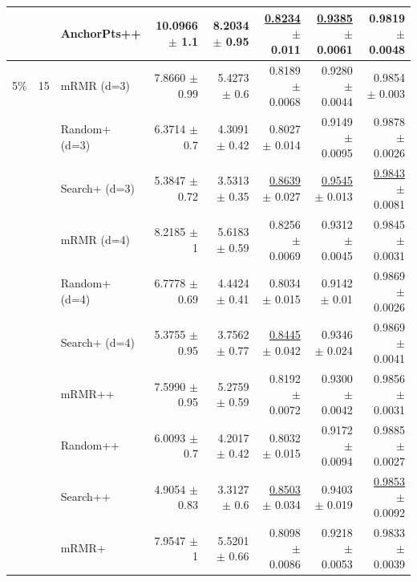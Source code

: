 \begin{longtable}{llp{}rrrrr}
 &  & AnchorPts++ & 10.0966 {\scriptsize $\pm$ 1.1} & 8.2034 {\scriptsize $\pm$ 0.95} & \underline{0.8234} {\scriptsize $\pm$ 0.011} & \underline{0.9385} {\scriptsize $\pm$ 0.0061} & 0.9819 {\scriptsize $\pm$ 0.0048} \\
\midrule
5\% & 15 & mRMR (d=3) & 7.8660 {\scriptsize $\pm$ 0.99} & 5.4273 {\scriptsize $\pm$ 0.6} & 0.8189 {\scriptsize $\pm$ 0.0068} & 0.9280 {\scriptsize $\pm$ 0.0044} & 0.9854 {\scriptsize $\pm$ 0.003} \\
 &  & Random+ (d=3) & 6.3714 {\scriptsize $\pm$ 0.7} & 4.3091 {\scriptsize $\pm$ 0.42} & 0.8027 {\scriptsize $\pm$ 0.014} & 0.9149 {\scriptsize $\pm$ 0.0095} & 0.9878 {\scriptsize $\pm$ 0.0026} \\
 &  & Search+ (d=3) & 5.3847 {\scriptsize $\pm$ 0.72} & 3.5313 {\scriptsize $\pm$ 0.35} & \underline{0.8639} {\scriptsize $\pm$ 0.027} & \underline{0.9545} {\scriptsize $\pm$ 0.013} & \underline{0.9843} {\scriptsize $\pm$ 0.0081} \\
 &  & mRMR (d=4) & 8.2185 {\scriptsize $\pm$ 1} & 5.6183 {\scriptsize $\pm$ 0.59} & 0.8256 {\scriptsize $\pm$ 0.0069} & 0.9312 {\scriptsize $\pm$ 0.0045} & 0.9845 {\scriptsize $\pm$ 0.0031} \\
 &  & Random+ (d=4) & 6.7778 {\scriptsize $\pm$ 0.69} & 4.4424 {\scriptsize $\pm$ 0.41} & 0.8034 {\scriptsize $\pm$ 0.015} & 0.9142 {\scriptsize $\pm$ 0.01} & 0.9869 {\scriptsize $\pm$ 0.0026} \\
 &  & Search+ (d=4) & 5.3755 {\scriptsize $\pm$ 0.95} & 3.7562 {\scriptsize $\pm$ 0.77} & \underline{0.8445} {\scriptsize $\pm$ 0.042} & 0.9346 {\scriptsize $\pm$ 0.024} & 0.9869 {\scriptsize $\pm$ 0.0041} \\
 &  & mRMR++ & 7.5990 {\scriptsize $\pm$ 0.95} & 5.2759 {\scriptsize $\pm$ 0.59} & 0.8192 {\scriptsize $\pm$ 0.0072} & 0.9300 {\scriptsize $\pm$ 0.0042} & 0.9856 {\scriptsize $\pm$ 0.0031} \\
 &  & Random++ & 6.0093 {\scriptsize $\pm$ 0.7} & 4.2017 {\scriptsize $\pm$ 0.42} & 0.8032 {\scriptsize $\pm$ 0.015} & 0.9172 {\scriptsize $\pm$ 0.0094} & 0.9885 {\scriptsize $\pm$ 0.0027} \\
 &  & Search++ & 4.9054 {\scriptsize $\pm$ 0.83} & 3.3127 {\scriptsize $\pm$ 0.6} & \underline{0.8503} {\scriptsize $\pm$ 0.034} & 0.9403 {\scriptsize $\pm$ 0.019} & \underline{0.9853} {\scriptsize $\pm$ 0.0092} \\
 &  & mRMR+ & 7.9547 {\scriptsize $\pm$ 1} & 5.5201 {\scriptsize $\pm$ 0.66} & 0.8098 {\scriptsize $\pm$ 0.0086} & 0.9218 {\scriptsize $\pm$ 0.0053} & 0.9833 {\scriptsize $\pm$ 0.0039} \\

\end{longtable}
